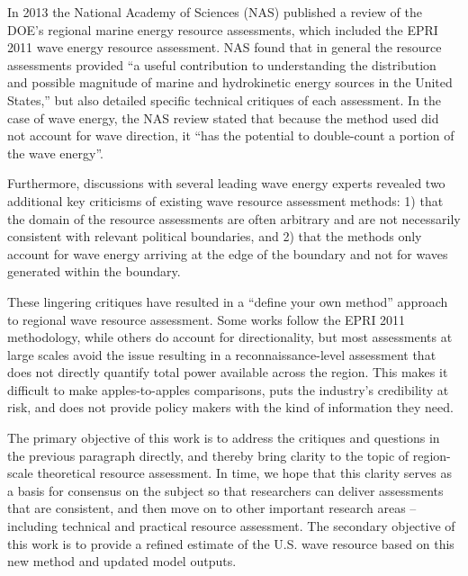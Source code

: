 In 2013 the National Academy of Sciences (NAS) published a review of the DOE’s regional marine energy resource assessments, which included the EPRI 2011 wave energy resource assessment. NAS found that in general the resource assessments provided “a useful contribution to understanding the distribution and possible magnitude of marine and hydrokinetic energy sources in the United States,” but also detailed specific technical critiques of each assessment. In the case of wave energy, the NAS review stated that because the method used did not account for wave direction, it “has the potential to double-count a portion of the wave energy”. 

Furthermore, discussions with several leading wave energy experts revealed two additional key criticisms of existing wave resource assessment methods: 1) that the domain of the resource assessments are often arbitrary and are not necessarily consistent with relevant political boundaries, and 2) that the methods only account for wave energy arriving at the edge of the boundary and not for waves generated within the boundary.

These lingering critiques have resulted in a “define your own method” approach to regional wave resource assessment. Some works follow the EPRI 2011 methodology, while others do account for directionality, but most assessments at large scales avoid the issue resulting in a reconnaissance-level assessment that does not directly quantify total power available across the region. This makes it difficult to make apples-to-apples comparisons, puts the industry’s credibility at risk, and does not provide policy makers with the kind of information they need. 

The primary objective of this work is to address the critiques and questions in the previous paragraph directly, and thereby bring clarity to the topic of region-scale theoretical resource assessment. In time, we hope that this clarity serves as a basis for consensus on the subject so that researchers can deliver assessments that are consistent, and then move on to other important research areas – including technical and practical resource assessment. The secondary objective of this work is to provide a refined estimate of the U.S. wave resource based on this new method and updated model outputs.

